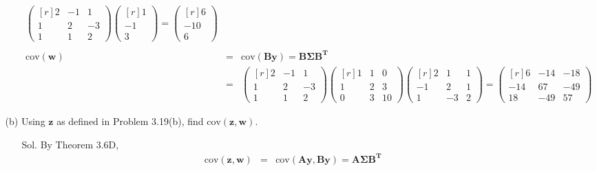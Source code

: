 \documentclass[12pt]{article} %
\begin{document}
\begin{enumerate}
\begin{enumerate}
\begin{enumerate}
\begin{eqnarray*}
\begin{pmatrix}[r]
					2 & -1 &  1 \\
					1 &  2 & -3 \\
					1 &  1 &  2				  	
				  \end{pmatrix}
				  \begin{pmatrix}[r]
					 1 \\
				    -1 \\
					 3			 					  
				  \end{pmatrix}
				  =
				  \begin{pmatrix}[r]
					  6\\
				    -10\\
					  6				  
				  \end{pmatrix}\\
				  \\
				  \mathrm{cov}(\mathbf{w})&=&\mathrm{cov}(\mathbf{By})=\mathbf{B\Sigma B^{T}}\\
				  &=&
				  \begin{pmatrix}[r]
					2 & -1 &  1 \\
					1 &  2 & -3  \\
					1 &  1 &  2				  	
				  \end{pmatrix}	
				\begin{pmatrix}[r]
					1 & 1 & 0 \\
					1 & 2 & 3 \\
					0 & 3 & 10 
				\end{pmatrix}
				  \begin{pmatrix}[r]
					 2 &  1 & 1 \\
					-1 &  2 & 1  \\
					 1 & -3 & 2				  	
				  \end{pmatrix}
				  =
				  \begin{pmatrix}[r]
					  6 & -14 & -18 \\
			  	    -14 & 67 &  -49 \\
					 18 &-49 &   57 
				  \end{pmatrix}			  							    	  
			    \end{eqnarray*}
			\end{enumerate}
		\item[(b)] Using $\mathbf{z}$ as defined in Problem 3.19(b), find $\mathrm{cov}(\mathbf{z, w})$.			
			\begin{enumerate}
				\item[Sol.] By Theorem 3.6D, 
					\begin{eqnarray*}
						\mathrm{cov}(\mathbf{z, w})&=&\mathrm{cov}(\mathbf{Ay, By})=\mathbf{A\Sigma B^{T}}	\\

\end{eqnarray*}
\end{enumerate}
\end{enumerate}
\end{enumerate}
\end{document}
